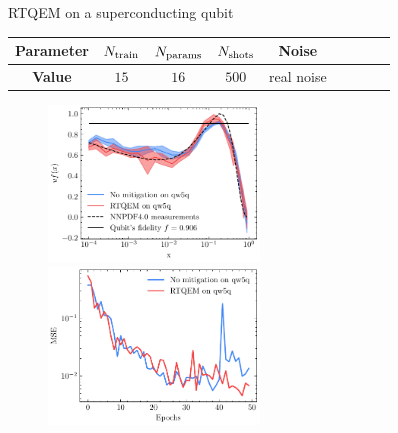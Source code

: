 \documentclass[8pt, xcolor={svgnames}, hyperref={linkcolor=black}]{beamer}
\begin{document}
\begin{frame}{RTQEM on a superconducting qubit}
\begin{center}
\footnotesize
\begin{tabular}{ccccccccc}
\hline \hline 
\rule{0pt}{2.5ex}
\textbf{Parameter} & $N_{\rm train}$ & $N_{\rm params}$ & $N_{\rm shots}$ 
& Noise \\
\hline
\rule{0pt}{2.5ex}
\textbf{Value} & $15$ & $16$ & $500$  & real noise\\
\hline \hline 
\end{tabular}
\end{center}

\begin{figure}
    \includegraphics[width=0.5\textwidth]{figures/qw5q_short.pdf}%
    \includegraphics[width=0.5\textwidth]{figures/losses_qw5q.pdf}
\end{figure}
\end{frame}
\end{document}
